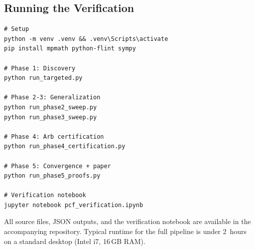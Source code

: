 \subsection{Running the Verification}

\begin{verbatim}
# Setup
python -m venv .venv && .venv\Scripts\activate
pip install mpmath python-flint sympy

# Phase 1: Discovery
python run_targeted.py

# Phase 2-3: Generalization
python run_phase2_sweep.py
python run_phase3_sweep.py

# Phase 4: Arb certification
python run_phase4_certification.py

# Phase 5: Convergence + paper
python run_phase5_proofs.py

# Verification notebook
jupyter notebook pcf_verification.ipynb
\end{verbatim}

\noindent All source files, JSON outputs, and the verification notebook
are available in the accompanying repository.
Typical runtime for the full pipeline is under 2~hours on a standard
desktop (Intel i7, 16\,GB RAM).
